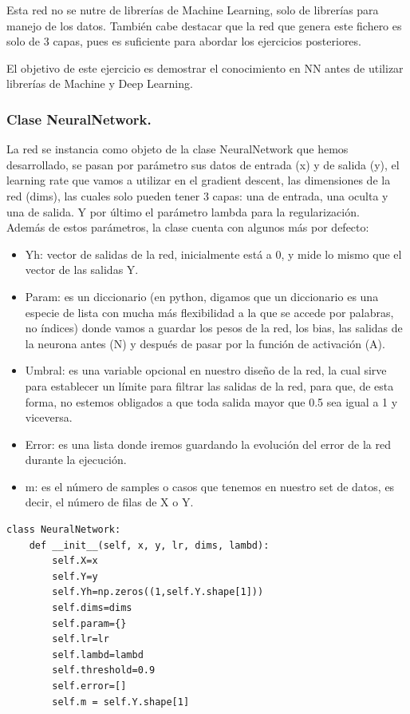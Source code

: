 \documentclass[a4paper,11pt]{article}
\begin{document}
\noindent
 Esta red no se nutre de librerías de Machine Learning, solo de librerías para manejo de los datos. También cabe destacar que la red que genera este fichero es solo de 3 capas, pues es suficiente para abordar los ejercicios posteriores.

\noindent
 El objetivo de este ejercicio es demostrar el conocimiento en NN antes de utilizar librerías de Machine y Deep Learning.
\subsubsection{Clase NeuralNetwork.}

La red se instancia como objeto de la clase NeuralNetwork que hemos desarrollado, se pasan por parámetro sus datos de entrada (x) y de salida (y), el learning rate que vamos a utilizar en el gradient descent, las dimensiones de la red (dims), las cuales solo pueden tener 3 capas: una de entrada, una oculta y una de salida. Y por último el parámetro lambda para la regularización. \\Además de estos parámetros, la clase cuenta con algunos más por defecto:
\begin{itemize}
    \item Yh: vector de salidas de la red, inicialmente está a 0, y mide lo mismo que el vector de las salidas Y.
    \item Param: es un diccionario (en python, digamos que un diccionario es una especie de lista con mucha más flexibilidad a la que se accede por palabras, no índices) donde vamos a guardar los pesos de la red, los bias, las salidas de la neurona antes (N) y después de pasar por la función de activación (A).
    \item Umbral: es una variable opcional en nuestro diseño de la red, la cual sirve para establecer un límite para filtrar las salidas de la red, para que, de esta forma, no estemos obligados a que toda salida mayor que 0.5 sea igual a 1 y viceversa.
    \item Error: es una lista donde iremos guardando la evolución del error de la red durante la ejecución.
    \item m: es el número de samples o casos que tenemos en nuestro set de datos, es decir, el número de filas de X o Y.
\end{itemize}
\begin{lstlisting}
class NeuralNetwork:
    def __init__(self, x, y, lr, dims, lambd):
        self.X=x
        self.Y=y
        self.Yh=np.zeros((1,self.Y.shape[1]))
        self.dims=dims
        self.param={}
        self.lr=lr
        self.lambd=lambd
        self.threshold=0.9
        self.error=[]
        self.m = self.Y.shape[1]
\end{lstlisting}
\end{document}
